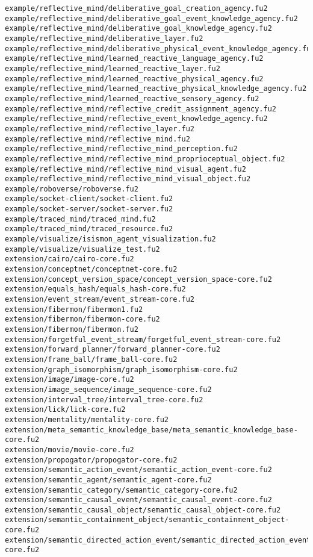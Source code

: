 \begin{lstlisting}
example/reflective_mind/deliberative_goal_creation_agency.fu2
example/reflective_mind/deliberative_goal_event_knowledge_agency.fu2
example/reflective_mind/deliberative_goal_knowledge_agency.fu2
example/reflective_mind/deliberative_layer.fu2
example/reflective_mind/deliberative_physical_event_knowledge_agency.fu2
example/reflective_mind/learned_reactive_language_agency.fu2
example/reflective_mind/learned_reactive_layer.fu2
example/reflective_mind/learned_reactive_physical_agency.fu2
example/reflective_mind/learned_reactive_physical_knowledge_agency.fu2
example/reflective_mind/learned_reactive_sensory_agency.fu2
example/reflective_mind/reflective_credit_assignment_agency.fu2
example/reflective_mind/reflective_event_knowledge_agency.fu2
example/reflective_mind/reflective_layer.fu2
example/reflective_mind/reflective_mind.fu2
example/reflective_mind/reflective_mind_perception.fu2
example/reflective_mind/reflective_mind_proprioceptual_object.fu2
example/reflective_mind/reflective_mind_visual_agent.fu2
example/reflective_mind/reflective_mind_visual_object.fu2
example/roboverse/roboverse.fu2
example/socket-client/socket-client.fu2
example/socket-server/socket-server.fu2
example/traced_mind/traced_mind.fu2
example/traced_mind/traced_resource.fu2
example/visualize/isismon_agent_visualization.fu2
example/visualize/visualize_test.fu2
extension/cairo/cairo-core.fu2
extension/conceptnet/conceptnet-core.fu2
extension/concept_version_space/concept_version_space-core.fu2
extension/equals_hash/equals_hash-core.fu2
extension/event_stream/event_stream-core.fu2
extension/fibermon/fibermon1.fu2
extension/fibermon/fibermon-core.fu2
extension/fibermon/fibermon.fu2
extension/forgetful_event_stream/forgetful_event_stream-core.fu2
extension/forward_planner/forward_planner-core.fu2
extension/frame_ball/frame_ball-core.fu2
extension/graph_isomorphism/graph_isomorphism-core.fu2
extension/image/image-core.fu2
extension/image_sequence/image_sequence-core.fu2
extension/interval_tree/interval_tree-core.fu2
extension/lick/lick-core.fu2
extension/mentality/mentality-core.fu2
extension/meta_semantic_knowledge_base/meta_semantic_knowledge_base-core.fu2
extension/movie/movie-core.fu2
extension/propogator/propogator-core.fu2
extension/semantic_action_event/semantic_action_event-core.fu2
extension/semantic_agent/semantic_agent-core.fu2
extension/semantic_category/semantic_category-core.fu2
extension/semantic_causal_event/semantic_causal_event-core.fu2
extension/semantic_causal_object/semantic_causal_object-core.fu2
extension/semantic_containment_object/semantic_containment_object-core.fu2
extension/semantic_directed_action_event/semantic_directed_action_event-core.fu2

\end{lstlisting}
